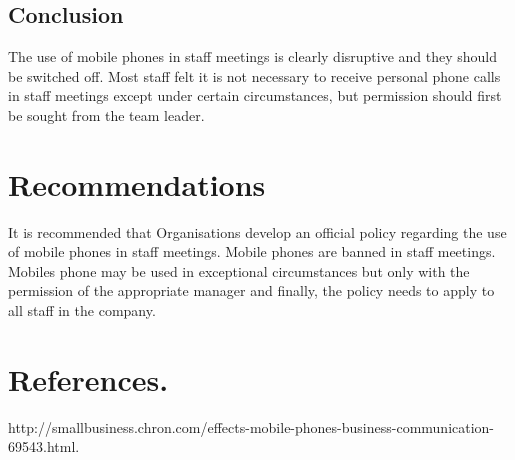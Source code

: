 \documentclass[12pt]{article}
\begin{document}
\subsection{Conclusion }
The use of mobile phones in staff meetings is clearly disruptive and they should be switched off. Most staff felt it is not necessary to receive personal phone calls in staff meetings except under certain circumstances, but permission should first be sought from the team leader.
\section{Recommendations}
It is recommended that Organisations develop an official policy regarding the use of mobile phones in staff meetings. 
Mobile phones are banned in staff meetings.
Mobiles phone may be used in exceptional circumstances but only with the permission of the appropriate manager and finally, the policy needs to apply to all staff in the company.
\section{References.}
http://smallbusiness.chron.com/effects-mobile-phones-business-communication-
69543.html.
\end{document}

